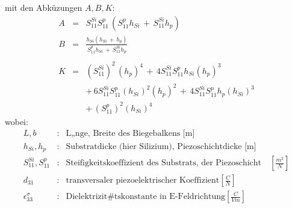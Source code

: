 %
mit den Abküzungen $ A, B, K $:
%
\begin{eqnarray*}
   A & = & S^{Si}_{11} S^{p}_{11} \, \left( S^{p}_{11} h_{Si} \, + \,
           S^{Si}_{11} h_{p} \right ) \\
   B & = & \frac{h_{Si} (h_{Si} \, + \, h_{p}) }{ S^{p}_{11} h_{Si} \,
               +  \, S^{Si}_{11} h_{p}} \\
     &   &   \nonumber  \\
   K & = & (S^{Si}_{11})^{2} \, (h_{p})^{4} \, + \, 4S^{Si}_{11}
                   S^{p}_{11} h_{Si}(h_{p})^{3} \nonumber \\
     &   & + \, 6S^{Si}_{11} S^{p}_{11}(h_{Si})^{2}(h_{p})^{2} \, + \,
                4S^{Si}_{11} S^{p}_{11} h_{p} (h_{Si})^{3} \nonumber \\
     &   & + \, (S^{p}_{11})^{2}(h_{Si})^{4}
 \end{eqnarray*}
%
wobei:
\begin{eqnarray*}
 L, b                      & : &
  \mbox{L„nge, Breite des Biegebalkens [m]} \\
 h_{Si},h_{p}              & : &
  \mbox{Substratdicke (hier Silizium), Piezoschichtdicke [m]}   \\
 S^{Si}_{11}, S^{p}_{11}   & : &
  \mbox{Steifigkeitskoeffizient des Substrats, der Piezoschicht}
  \quad \left [ \frac{m^{2}}{N} \right ] \\
 d_{31} & : & \mbox{transversaler piezoelektrischer Koeffizient}
  \left [ \frac{C}{N} \right ] \\
 \epsilon^{\sigma}_{33}    & : &
  \mbox{Dielektrizit#tskonstante in E-Feldrichtung}
  \left [ \frac{C}{Vm}\right ]
\end{eqnarray*}

